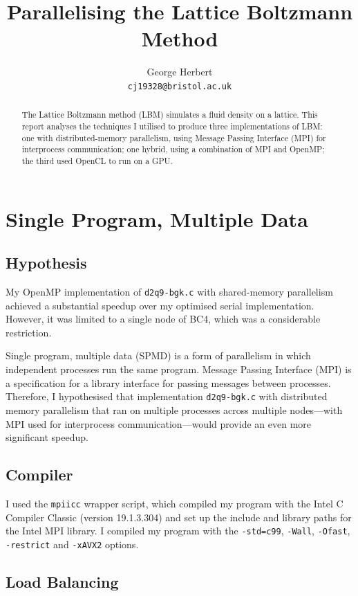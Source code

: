 \documentclass[twocolumn, a4paper]{article}
\author{
  George Herbert\\
  \texttt{cj19328@bristol.ac.uk}
}
\title{\vspace{-2em}Parallelising the Lattice Boltzmann Method}
\begin{document}
\maketitle

\begin{abstract}
  The Lattice Boltzmann method (LBM) simulates a fluid density on a lattice.
  This report analyses the techniques I utilised to produce three implementations of LBM: one with distributed-memory parallelism, using Message Passing Interface (MPI) for interprocess communication; one hybrid, using a combination of MPI and OpenMP; the third used OpenCL to run on a GPU.
\end{abstract}

\section{Single Program, Multiple Data}

\subsection{Hypothesis}

My OpenMP implementation of \texttt{d2q9-bgk.c} with shared-memory parallelism achieved a substantial speedup over my optimised serial implementation.
However, it was limited to a single node of BC4, which was a considerable restriction.

Single program, multiple data (SPMD) is a form of parallelism in which independent processes run the same program.
Message Passing Interface (MPI) is a specification for a library interface for passing messages between processes.
Therefore, I hypothesised that implementation \texttt{d2q9-bgk.c} with distributed memory parallelism that ran on multiple processes across multiple nodes---with MPI used for interprocess communication---would provide an even more significant speedup.

\subsection{Compiler}

I used the \texttt{mpiicc} wrapper script, which compiled my program with the Intel C Compiler Classic (version 19.1.3.304) and set up the include and library paths for the Intel MPI library.
I compiled my program with the \texttt{-std=c99}, \texttt{-Wall}, \texttt{-Ofast}, \texttt{-restrict} and \texttt{-xAVX2} options.

\subsection{Load Balancing}
\end{document}
